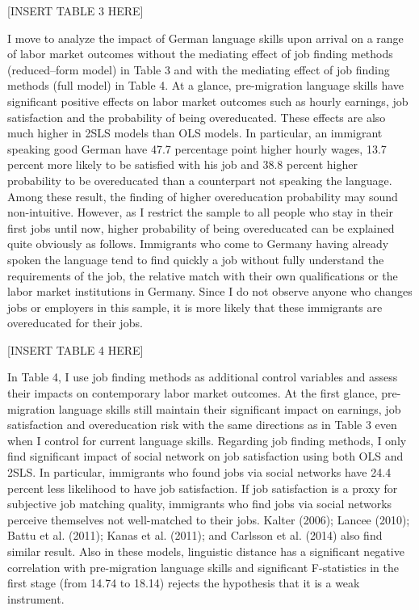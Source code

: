 \documentclass[12pt,a4paper]{article}
\begin{document}
\begin{center}
[INSERT TABLE 3 HERE]
\end{center}

I move to analyze the impact of German language skills upon arrival on a range of labor market outcomes without the mediating effect of job finding methods (reduced--form model) in Table 3 and with the mediating effect of job finding methods (full model) in Table 4. At a glance, pre-migration language skills have significant positive effects on labor market outcomes such as hourly earnings, job satisfaction and the probability of being overeducated. These effects are also much higher in 2SLS models than OLS models. In particular, an immigrant speaking good German have 47.7 percentage point higher hourly wages, 13.7 percent more likely to be satisfied with his job and 38.8 percent higher probability to be overeducated than a counterpart not speaking the language. Among these result, the finding of higher overeducation probability may sound non-intuitive. However, as I restrict the sample to all people who stay in their first jobs until now, higher probability of being overeducated can be explained quite obviously as follows. Immigrants who come to Germany having already spoken the language tend to find quickly a job without fully understand the requirements of the job, the relative match with their own qualifications or the labor market institutions in Germany. Since I do not observe anyone who changes jobs or employers in this sample, it is more likely that these immigrants are overeducated for their jobs.

\begin{center}
[INSERT TABLE 4 HERE]
\end{center}

In Table 4, I use job finding methods as additional control variables and assess their impacts on contemporary labor market outcomes. At the first glance, pre-migration language skills still maintain their significant impact on earnings, job satisfaction and overeducation risk with the same directions as in Table 3 even when I control for current language skills. Regarding job finding methods, I only find significant impact of social network on job satisfaction using both OLS and 2SLS. In particular, immigrants who found jobs via social networks have 24.4 percent less likelihood to have job satisfaction. If job satisfaction is a proxy for subjective job matching quality, immigrants who find jobs via social networks perceive themselves not well-matched to their jobs. Kalter (2006); Lancee (2010); Battu et al. (2011); Kanas et al. (2011); and Carlsson et al. (2014) also find similar result. Also in these models, linguistic distance has a significant negative correlation with pre-migration language skills and significant F-statistics in the first stage (from 14.74 to 18.14) rejects the hypothesis that it is a weak instrument.
\end{document}
